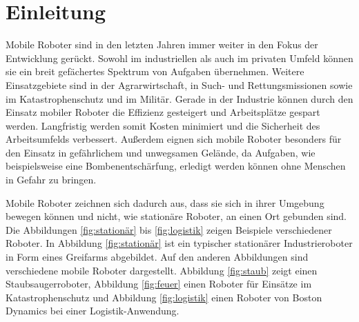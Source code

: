 \chapter[Einleitung (Schmelzer)]{Einleitung}


Mobile Roboter sind in den letzten Jahren immer weiter in den Fokus der Entwicklung gerückt. Sowohl im industriellen als auch im privaten Umfeld können sie ein breit gefächertes Spektrum von Aufgaben übernehmen. Weitere Einsatzgebiete sind in der Agrarwirtschaft, in Such- und Rettungsmissionen sowie im Katastrophenschutz und im Militär. Gerade in der Industrie können durch den Einsatz mobiler Roboter die Effizienz gesteigert und Arbeitsplätze gespart werden. Langfristig werden somit Kosten minimiert und die Sicherheit des Arbeitsumfelds verbessert. Außerdem eignen sich mobile Roboter besonders für den Einsatz in gefährlichem und unwegsamen Gelände, da Aufgaben, wie beispielsweise eine Bombenentschärfung, erledigt werden können ohne Menschen in Gefahr zu bringen.   

Mobile Roboter zeichnen sich dadurch aus, dass sie sich in ihrer Umgebung bewegen können und nicht, wie stationäre Roboter, an einen Ort gebunden sind. Die Abbildungen \ref{fig:stationär} bis \ref{fig:logistik} zeigen Beispiele verschiedener Roboter. In Abbildung \ref{fig:stationär} ist ein typischer stationärer Industrieroboter in Form eines Greifarms abgebildet. Auf den anderen Abbildungen sind verschiedene mobile Roboter dargestellt. Abbildung \ref{fig:staub} zeigt einen Staubsaugerroboter, Abbildung \ref{fig:feuer} einen Roboter für Einsätze im Katastrophenschutz und  Abbildung \ref{fig:logistik} einen Roboter von Boston Dynamics bei einer Logistik-Anwendung. 

